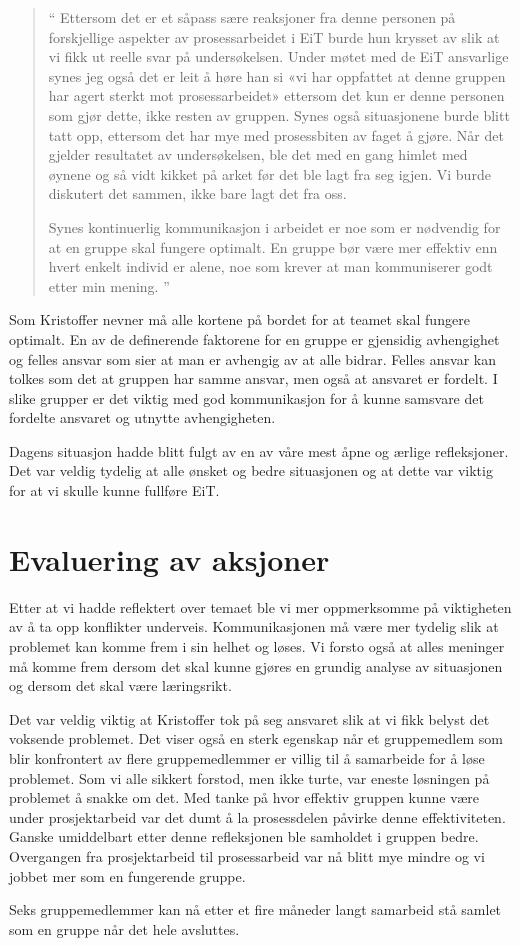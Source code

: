 \begin{quote}``
Ettersom det er et såpass sære reaksjoner fra denne personen på 
forskjellige aspekter av prosessarbeidet i EiT burde hun krysset av slik at vi fikk ut reelle svar på undersøkelsen. 
Under møtet med de EiT ansvarlige synes jeg også det er leit å høre han si «vi har oppfattet at denne gruppen har agert 
sterkt mot prosessarbeidet» ettersom det kun er denne personen som gjør dette, ikke resten av gruppen. Synes 
også situasjonene burde blitt tatt opp, ettersom det har mye med prosessbiten av faget å gjøre. Når det gjelder 
resultatet av undersøkelsen, ble det med en gang himlet med øynene og så vidt kikket på arket før det ble lagt fra 
seg igjen. Vi burde diskutert det sammen, ikke bare lagt det fra oss.

Synes kontinuerlig kommunikasjon i arbeidet er noe som er nødvendig for at en gruppe skal fungere optimalt. En 
gruppe bør være mer effektiv enn hvert enkelt individ er alene, noe som krever at man kommuniserer godt etter min 
mening.
''\end{quote} 

Som Kristoffer nevner må alle kortene på bordet for at teamet skal fungere optimalt. En av de definerende faktorene
for en gruppe er gjensidig avhengighet og felles ansvar \cite{Artikkel4} som sier at man er avhengig av at
alle bidrar. Felles ansvar kan tolkes som det at gruppen har samme ansvar, men også at ansvaret er fordelt. I slike 
grupper er det viktig med god kommunikasjon for å kunne samsvare det fordelte ansvaret og utnytte avhengigheten.

Dagens situasjon hadde blitt fulgt av en av våre mest åpne og ærlige refleksjoner. Det var veldig tydelig at
alle ønsket og bedre situasjonen og at dette var viktig for at vi skulle kunne fullføre EiT. 

\section{Evaluering av aksjoner}

Etter at vi hadde reflektert over temaet ble vi mer oppmerksomme på viktigheten av å ta opp konflikter underveis.
Kommunikasjonen må være mer tydelig slik at problemet kan komme frem i sin helhet og løses. 
Vi forsto også at alles meninger må komme frem dersom det skal kunne gjøres en grundig analyse av situasjonen
og dersom det skal være læringsrikt. 

Det var veldig viktig at Kristoffer tok på seg ansvaret slik at vi fikk belyst det voksende problemet.
Det viser også en sterk egenskap når et gruppemedlem som blir konfrontert av flere gruppemedlemmer er villig til 
å samarbeide for å løse problemet. 
Som vi alle sikkert forstod, men ikke turte, var eneste løsningen på problemet å snakke om det. 
Med tanke på hvor effektiv gruppen kunne være under prosjektarbeid var det dumt å la prosessdelen påvirke
denne effektiviteten. Ganske umiddelbart etter denne refleksjonen ble samholdet i gruppen bedre.
Overgangen fra prosjektarbeid til prosessarbeid var nå blitt mye mindre og vi jobbet mer som en fungerende gruppe.

Seks gruppemedlemmer kan nå etter et fire måneder langt samarbeid stå samlet som en gruppe når det hele avsluttes.